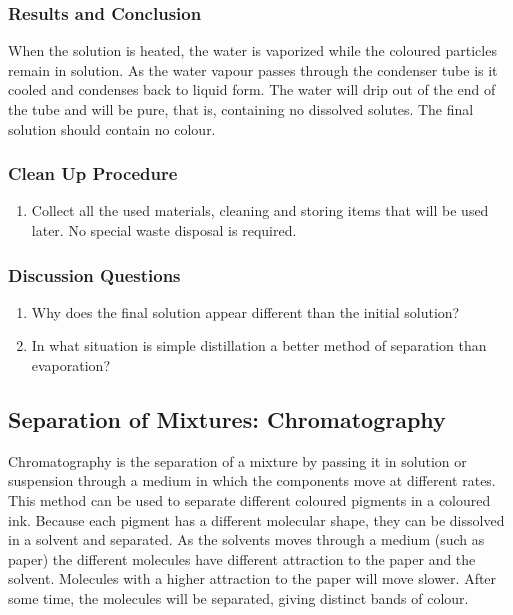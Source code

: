 \subsubsection*{Results and Conclusion}
When the solution is heated, the water is vaporized while the coloured particles remain in solution. As the water vapour passes through the condenser tube is it cooled and condenses back to liquid form. The water will drip out of the end of the tube and will be pure, that is, containing no dissolved solutes. The final solution should contain no colour.

\subsubsection*{Clean Up Procedure}
\begin{enumerate}
\item{Collect all the used materials, cleaning and storing items that will be used later. No special waste disposal is required.}
\end{enumerate}

\subsubsection*{Discussion Questions}
\begin{enumerate}
\item{Why does the final solution appear different than the initial solution?}
\item{In what situation is simple distillation a better method of separation than evaporation?}

\end{enumerate}

\subsection{Separation of Mixtures: Chromatography}
Chromatography is the separation of a mixture by passing it in solution or suspension through a medium in which the components move at different rates. This method can be used to separate different coloured pigments in a coloured ink. Because each pigment has a different molecular shape, they can be dissolved in a solvent and separated. As the solvents moves through a medium (such as paper) the different molecules have different attraction to the paper and the solvent. Molecules with a higher attraction to the paper will move slower. After some time, the molecules will be separated, giving distinct bands of colour.

